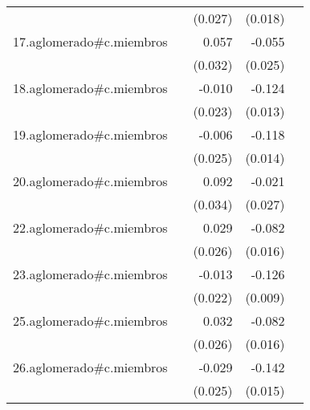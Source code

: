 {\begin{longtable}{l*{4}{D{.}{.}{-1}}}
            &                     &     (0.027)         &     (0.018)         &                     \\
\addlinespace
17.aglomerado#c.miembros&                     &       0.057         &      -0.055\sym{*}  &                     \\
            &                     &     (0.032)         &     (0.025)         &                     \\
\addlinespace
18.aglomerado#c.miembros&                     &      -0.010         &      -0.124\sym{***}&                     \\
            &                     &     (0.023)         &     (0.013)         &                     \\
\addlinespace
19.aglomerado#c.miembros&                     &      -0.006         &      -0.118\sym{***}&                     \\
            &                     &     (0.025)         &     (0.014)         &                     \\
\addlinespace
20.aglomerado#c.miembros&                     &       0.092\sym{**} &      -0.021         &                     \\
            &                     &     (0.034)         &     (0.027)         &                     \\
\addlinespace
22.aglomerado#c.miembros&                     &       0.029         &      -0.082\sym{***}&                     \\
            &                     &     (0.026)         &     (0.016)         &                     \\
\addlinespace
23.aglomerado#c.miembros&                     &      -0.013         &      -0.126\sym{***}&                     \\
            &                     &     (0.022)         &     (0.009)         &                     \\
\addlinespace
25.aglomerado#c.miembros&                     &       0.032         &      -0.082\sym{***}&                     \\
            &                     &     (0.026)         &     (0.016)         &                     \\
\addlinespace
26.aglomerado#c.miembros&                     &      -0.029         &      -0.142\sym{***}&                     \\
            &                     &     (0.025)         &     (0.015)         &                     \\

\end{longtable}}
